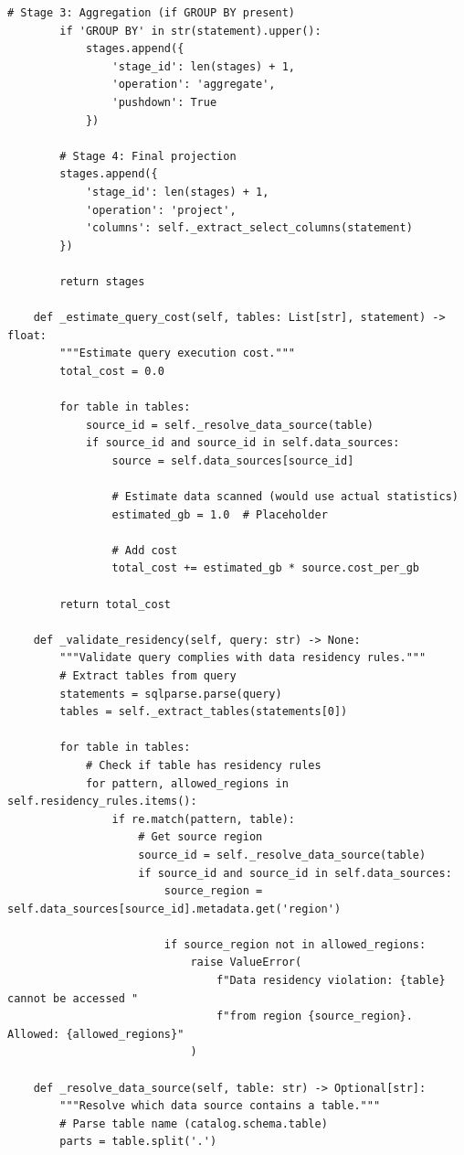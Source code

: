 \begin{lstlisting}[style=python, caption=DataVirtualizer with Federated Queries]
        # Stage 3: Aggregation (if GROUP BY present)
        if 'GROUP BY' in str(statement).upper():
            stages.append({
                'stage_id': len(stages) + 1,
                'operation': 'aggregate',
                'pushdown': True
            })

        # Stage 4: Final projection
        stages.append({
            'stage_id': len(stages) + 1,
            'operation': 'project',
            'columns': self._extract_select_columns(statement)
        })

        return stages

    def _estimate_query_cost(self, tables: List[str], statement) -> float:
        """Estimate query execution cost."""
        total_cost = 0.0

        for table in tables:
            source_id = self._resolve_data_source(table)
            if source_id and source_id in self.data_sources:
                source = self.data_sources[source_id]

                # Estimate data scanned (would use actual statistics)
                estimated_gb = 1.0  # Placeholder

                # Add cost
                total_cost += estimated_gb * source.cost_per_gb

        return total_cost

    def _validate_residency(self, query: str) -> None:
        """Validate query complies with data residency rules."""
        # Extract tables from query
        statements = sqlparse.parse(query)
        tables = self._extract_tables(statements[0])

        for table in tables:
            # Check if table has residency rules
            for pattern, allowed_regions in self.residency_rules.items():
                if re.match(pattern, table):
                    # Get source region
                    source_id = self._resolve_data_source(table)
                    if source_id and source_id in self.data_sources:
                        source_region = self.data_sources[source_id].metadata.get('region')

                        if source_region not in allowed_regions:
                            raise ValueError(
                                f"Data residency violation: {table} cannot be accessed "
                                f"from region {source_region}. Allowed: {allowed_regions}"
                            )

    def _resolve_data_source(self, table: str) -> Optional[str]:
        """Resolve which data source contains a table."""
        # Parse table name (catalog.schema.table)
        parts = table.split('.')


\end{lstlisting}
